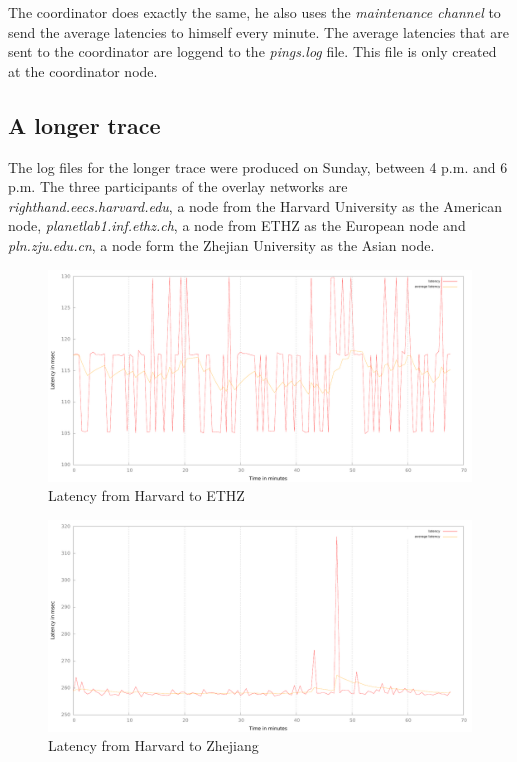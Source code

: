 \documentclass[paper=a4, fontsize=11pt]{scrartcl} %
\numberwithin{equation}{section} %
\numberwithin{figure}{section} %
\numberwithin{table}{section} %
\begin{document}
The coordinator does exactly the same, he also uses the \textit{maintenance channel} to send the average latencies to himself every minute. The average latencies that are sent to the coordinator are loggend to the \textit{pings.log} file. This file is only created at the coordinator node.

\subsection{A longer trace}

The log files for the longer trace were produced on Sunday, between 4 p.m. and 6 p.m. The three participants of the overlay networks are \textit{righthand.eecs.harvard.edu}, a node from the Harvard University as the American node, \textit{planetlab1.inf.ethz.ch}, a node from ETHZ as the European node and \textit{pln.zju.edu.cn}, a node form the Zhejian University as the Asian node.

\begin{figure}[th]
\includegraphics[width=\columnwidth]{latency_harvard_ethz.pdf}
\caption{Latency from Harvard to ETHZ}
\end{figure}

\begin{figure}[th]
\includegraphics[width=\columnwidth]{latency_harvard_zhejiang.pdf}
\caption{Latency from Harvard to Zhejiang}
\end{figure}

\end{document}
